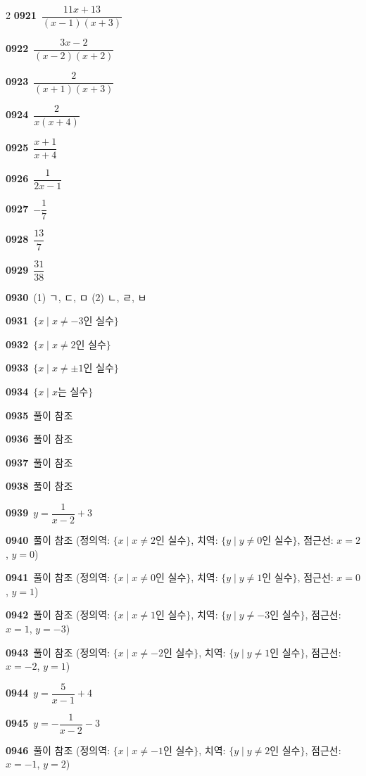 \documentclass[10pt,a4paper]{article}
\begin{document}
\begin{multicols}{2}
\noindent\textbf{0921}\ $\dfrac{11x+13}{(x-1)(x+3)}$\par
\noindent\textbf{0922}\ $\dfrac{3x-2}{(x-2)(x+2)}$\par
\noindent\textbf{0923}\ $\dfrac{2}{(x+1)(x+3)}$\par
\noindent\textbf{0924}\ $\dfrac{2}{x(x+4)}$\par
\noindent\textbf{0925}\ $\dfrac{x+1}{x+4}$\par
\noindent\textbf{0926}\ $\dfrac{1}{2x-1}$\par
\noindent\textbf{0927}\ $-\dfrac{1}{7}$\par
\noindent\textbf{0928}\ $\dfrac{13}{7}$\par
\noindent\textbf{0929}\ $\dfrac{31}{38}$\par
\noindent\textbf{0930}\ (1) ㄱ, ㄷ, ㅁ (2) ㄴ, ㄹ, ㅂ\par
\noindent\textbf{0931}\ $\{x \mid x\ne -3$인 실수$\}$\par
\noindent\textbf{0932}\ $\{x \mid x\ne 2$인 실수$\}$\par
\noindent\textbf{0933}\ $\{x \mid x\ne \pm 1$인 실수$\}$\par
\noindent\textbf{0934}\ $\{x \mid x$는 실수$\}$\par
\noindent\textbf{0935}\ 풀이 참조\par
\noindent\textbf{0936}\ 풀이 참조\par
\noindent\textbf{0937}\ 풀이 참조\par
\noindent\textbf{0938}\ 풀이 참조\par
\noindent\textbf{0939}\ $y=\dfrac{1}{x-2}+3$\par
\noindent\textbf{0940}\ 풀이 참조 (정의역: $\{x \mid x\ne 2$인 실수$\}$, 치역: $\{y \mid y\ne 0$인 실수$\}$, 점근선: $x=2$, $y=0$)\par
\noindent\textbf{0941}\ 풀이 참조 (정의역: $\{x \mid x\ne 0$인 실수$\}$, 치역: $\{y \mid y\ne 1$인 실수$\}$, 점근선: $x=0$, $y=1$)\par
\noindent\textbf{0942}\ 풀이 참조 (정의역: $\{x \mid x\ne 1$인 실수$\}$, 치역: $\{y \mid y\ne -3$인 실수$\}$, 점근선: $x=1$, $y=-3$)\par
\noindent\textbf{0943}\ 풀이 참조 (정의역: $\{x \mid x\ne -2$인 실수$\}$, 치역: $\{y \mid y\ne 1$인 실수$\}$, 점근선: $x=-2$, $y=1$)\par
\noindent\textbf{0944}\ $y=\dfrac{5}{x-1}+4$\par
\noindent\textbf{0945}\ $y=-\dfrac{1}{x-2}-3$\par
\noindent\textbf{0946}\ 풀이 참조 (정의역: $\{x \mid x\ne -1$인 실수$\}$, 치역: $\{y \mid y\ne 2$인 실수$\}$, 점근선: $x=-1$, $y=2$)\par

\end{multicols}
\end{document}
